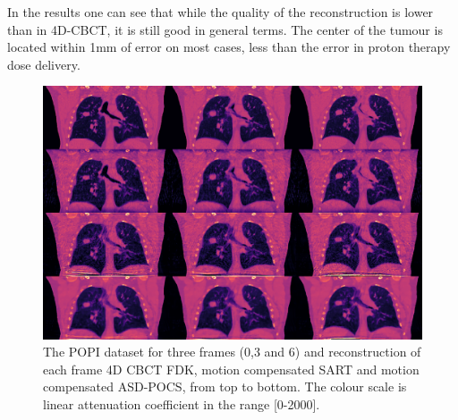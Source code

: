 In the results one can see that while the quality of the reconstruction is lower than in 4D-CBCT, it is still good in general terms. The center of the tumour is located within 1mm of error on most cases, less than the error in proton therapy dose delivery. 


\begin{figure}
\begin{center}

\includegraphics[width=\textwidth]{accuracyMC/MCCBCT3stage.png} 


\end{center}

\caption[Three frames of the motion compensated CBCT recosntruction with different algorithm]{\label{fig:MCCBCT3static} The POPI dataset for three frames (0,3 and 6) and reconstruction of each frame 4D CBCT FDK, motion compensated SART and motion compensated ASD-POCS, from top to bottom.  The colour scale is linear attenuation coefficient in the range [0-2000].} 
\end{figure}

